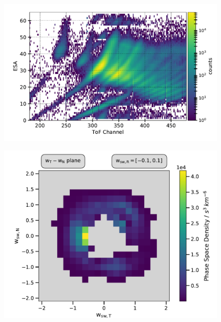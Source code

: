 \documentclass{beamer}
\begin{document}
\begin{frame}[plain]{}

	\begin{figure}
		\includegraphics[scale=.6]{Pics/epq_all.pdf}

	\end{figure}
	
\end{frame}

\begin{frame}[plain]{}
\begin{figure}
	\includegraphics[scale=.6]{Pics/cart_50_step-1.pdf}
\end{figure}
\end{frame}
\end{document}
